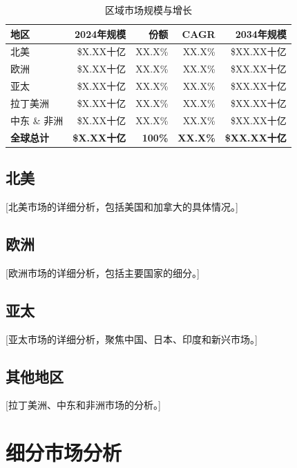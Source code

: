 \documentclass[11pt,letterpaper]{report}
\begin{document}
{\begin{table}[htbp]
\centering
\caption{区域市场规模与增长}
\begin{tabular}{@{}lrrrr@{}}
\toprule
\textbf{地区} & \textbf{2024年规模} & \textbf{份额} & \textbf{CAGR} & \textbf{2034年规模} \\
\midrule
北美 & \$X.XX十亿 & XX.X\% & XX.X\% & \$XX.XX十亿 \\
\rowcolor{tablealt} 欧洲 & \$X.XX十亿 & XX.X\% & XX.X\% & \$XX.XX十亿 \\
亚太 & \$X.XX十亿 & XX.X\% & XX.X\% & \$XX.XX十亿 \\
\rowcolor{tablealt} 拉丁美洲 & \$X.XX十亿 & XX.X\% & XX.X\% & \$XX.XX十亿 \\
中东 \& 非洲 & \$X.XX十亿 & XX.X\% & XX.X\% & \$XX.XX十亿 \\
\midrule
\textbf{全球总计} & \textbf{\$X.XX十亿} & \textbf{100\%} & \textbf{XX.X\%} & \textbf{\$XX.XX十亿} \\
\bottomrule
\end{tabular}
\label{tab:regional_market}
\end{table}

\subsection{北美}
[北美市场的详细分析，包括美国和加拿大的具体情况。]

\subsection{欧洲}
[欧洲市场的详细分析，包括主要国家的细分。]

\subsection{亚太}
[亚太市场的详细分析，聚焦中国、日本、印度和新兴市场。]

\subsection{其他地区}
[拉丁美洲、中东和非洲市场的分析。]

\section{细分市场分析}


}
\end{document}
